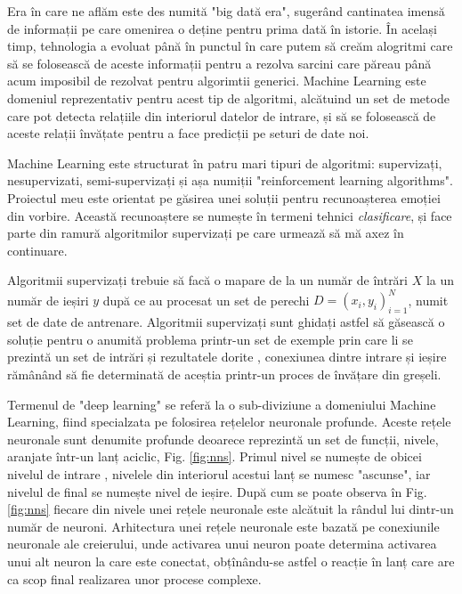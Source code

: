 \documentclass[a4paper,12pt]{book}
\begin{document}
			Era în care ne aflăm este des numită "big dată era", sugerând cantinatea imensă de informații pe care omenirea o deține pentru prima dată în istorie. În același timp, tehnologia a evoluat până în punctul în care putem să creăm alogritmi care să se folosească de aceste informații pentru a rezolva sarcini care păreau până acum imposibil de rezolvat pentru algorimtii generici. Machine Learning este domeniul reprezentativ pentru acest tip de algoritmi, alcătuind un set de metode care pot detecta relațiile din interiorul datelor de intrare, și să se folosească de aceste relații învățate pentru a face predicții pe seturi de date noi. \par
			
			Machine Learning este structurat în patru mari tipuri de algoritmi: supervizați, nesupervizati, semi-supervizați și așa numiții "reinforcement learning algorithms". Proiectul meu este orientat pe găsirea unei soluții pentru recunoașterea emoției din vorbire. Această recunoaștere se numește în termeni tehnici \textit{clasificare}, și face parte din ramură algoritmilor supervizați pe care urmează să mă axez în continuare. \par 
			Algoritmii supervizați trebuie să facă o mapare de la un număr de întrări $X$ la un număr de ieșiri $y$ după ce au procesat un set de perechi $D={(x_i,y_i)}^N_{i=1}$, numit set de date de antrenare. Algoritmii supervizați sunt ghidați astfel să găsească o soluție pentru o anumită problema printr-un set de exemple prin care li se prezintă un set de intrări și rezultatele dorite , conexiunea dintre intrare și ieșire rămânând să fie determinată de aceștia printr-un proces de învățare din greșeli. \par
			
			Termenul de "deep learning" se referă la o sub-diviziune a domeniului Machine Learning, fiind specialzata pe folosirea rețelelor neuronale profunde. Aceste rețele neuronale sunt denumite profunde deoarece reprezintă un set de funcții, nivele, aranjate într-un lanț aciclic, Fig. \ref{fig:nns}. Primul nivel se numește de obicei nivelul de intrare , nivelele din interiorul acestui lanț se numesc "ascunse", iar nivelul de final se numește nivel de ieșire. După cum se poate observa în Fig. \ref{fig:nns} fiecare din nivele unei rețele neuronale este alcătuit la rândul lui dintr-un număr de neuroni. Arhitectura unei rețele neuronale este bazată pe conexiunile neuronale ale creierului, unde activarea unui neuron poate determina activarea unui alt neuron la care este conectat, obțînându-se astfel o reacție în lanț care are ca scop final realizarea unor procese complexe. 
			
\end{document}
